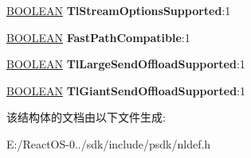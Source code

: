 \begin{DoxyCompactItemize}
\hyperlink{_processor_bind_8h_a112e3146cb38b6ee95e64d85842e380a}{B\+O\+O\+L\+E\+AN} {\bfseries Tl\+Stream\+Options\+Supported}\+:1
\item 
\mbox{\label{struct___n_l___i_n_t_e_r_f_a_c_e___o_f_f_l_o_a_d___r_o_d_ab9f5a6da1b70abfcdc5b2af22c08a8d5}} 
\hyperlink{_processor_bind_8h_a112e3146cb38b6ee95e64d85842e380a}{B\+O\+O\+L\+E\+AN} {\bfseries Fast\+Path\+Compatible}\+:1
\item 
\mbox{\label{struct___n_l___i_n_t_e_r_f_a_c_e___o_f_f_l_o_a_d___r_o_d_ab9888ff07d5ea457d19833a25976c940}} 
\hyperlink{_processor_bind_8h_a112e3146cb38b6ee95e64d85842e380a}{B\+O\+O\+L\+E\+AN} {\bfseries Tl\+Large\+Send\+Offload\+Supported}\+:1
\item 
\mbox{\label{struct___n_l___i_n_t_e_r_f_a_c_e___o_f_f_l_o_a_d___r_o_d_a3d94a2820161928a97b84637c966318e}} 
\hyperlink{_processor_bind_8h_a112e3146cb38b6ee95e64d85842e380a}{B\+O\+O\+L\+E\+AN} {\bfseries Tl\+Giant\+Send\+Offload\+Supported}\+:1
\end{DoxyCompactItemize}


该结构体的文档由以下文件生成\+:\begin{DoxyCompactItemize}
\item 
E\+:/\+React\+O\+S-\/0../sdk/include/psdk/nldef.\+h\end{DoxyCompactItemize}
